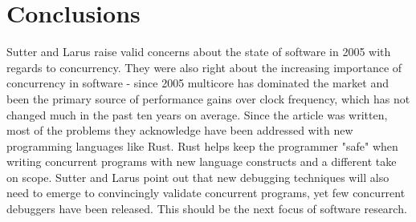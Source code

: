 \documentclass{article}
\begin{document}
\section*{Conclusions}
Sutter and Larus raise valid concerns about the state of software in 2005 with regards to concurrency. They were also right about the increasing importance of concurrency in software - since 2005 multicore has dominated the market and been the primary source of performance gains over clock frequency, which has not changed much in the past ten years on average. Since the article was written, most of the problems they acknowledge have been addressed with new programming languages like Rust. Rust helps keep the programmer "safe" when writing concurrent programs with new language constructs and a different take on scope. Sutter and Larus point out that new debugging techniques will also need to emerge to convincingly validate concurrent programs, yet few concurrent debuggers have been released. This should be the next focus of software research.




\end{document}
